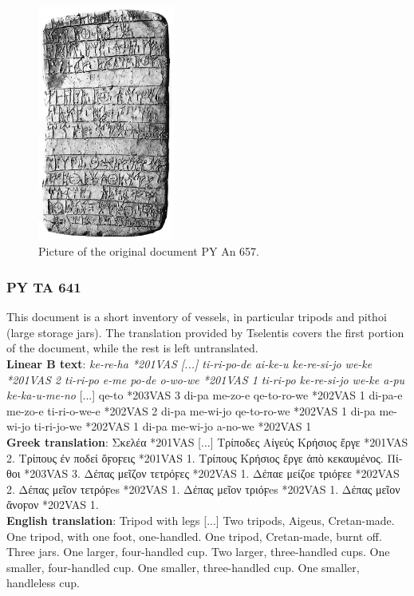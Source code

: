 \begin{figure}[H]
  \centering
  \includegraphics[width=0.4\textwidth]{Images/4726.png} %
  \caption{Picture of the original document PY An 657.}
  \label{fig:doc7}
\end{figure}

\subsubsection{PY TA 641} \label{doc:pyta641}
This document is a short inventory of vessels, in particular tripods and pithoi (large storage jars).
The translation provided by Tselentis covers the first portion of the document, while the rest is left untranslated. \\
\textbf{Linear B text}: \textit{ke-re-ha *201VAS [...] ti-ri-po-de ai-ke-u ke-re-si-jo we-ke *201VAS 2 ti-ri-po e-me po-de o-wo-we *201VAS 1 ti-ri-po ke-re-si-jo we-ke a-pu ke-ka-u-me-no} [...] qe-to *203VAS 3 di-pa me-zo-e qe-to-ro-we *202VAS 1 di-pa-e me-zo-e ti-ri-o-we-e *202VAS 2 di-pa me-wi-jo qe-to-ro-we *202VAS 1 di-pa me-wi-jo ti-ri-jo-we *202VAS 1 di-pa me-wi-jo a-no-we *202VAS 1 \\
\textbf{Greek translation}: \textgreek{Σκελέα *201VAS [...] Τρίποδες Αἰγεύς Κρήσιος ἔργε *201VAS 2. Τρίπους ἐν ποδεί ὄϝοϝεις *201VAS 1. Τρίπους Κρήσιος ἔργε ἀπὸ κεκαυμένος. Πίθοι *203VAS 3. Δέπας μεῖζον τετρόϝες *202VAS 1. Δέπαε μείζοε τριόϝεε *202VAS 2. Δέπας μεῖον τετρόϝes *202VAS 1. Δέπας μεῖον τριόϝes *202VAS 1. Δέπας μεῖον ἄνοϝον *202VAS 1.} \\
\textbf{English translation}: Tripod with legs [...] Two tripods, Aigeus, Cretan-made. One tripod, with one foot, one-handled. One tripod, Cretan-made, burnt off. Three jars. One larger, four-handled cup. Two larger, three-handled cups. One smaller, four-handled cup. One smaller, three-handled cup. One smaller, handleless cup.

